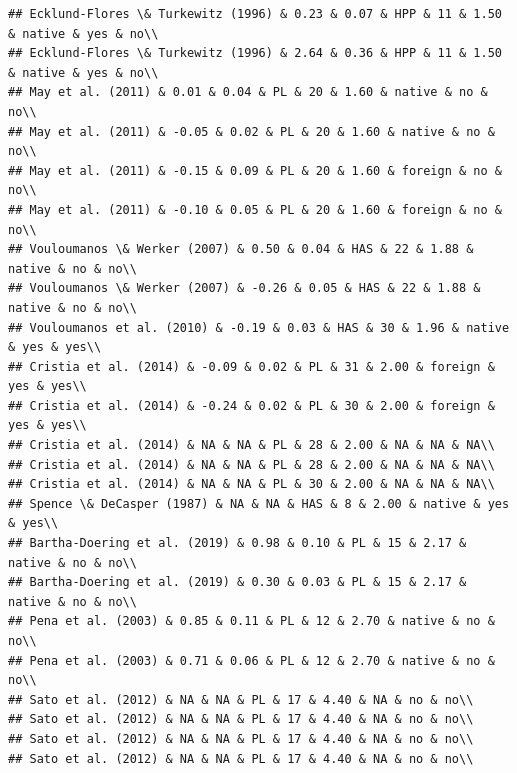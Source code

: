 \documentclass[man]{apa6}
\begin{document}
\begin{verbatim}
## Ecklund-Flores \& Turkewitz (1996) & 0.23 & 0.07 & HPP & 11 & 1.50 & native & yes & no\\
## Ecklund-Flores \& Turkewitz (1996) & 2.64 & 0.36 & HPP & 11 & 1.50 & native & yes & no\\
## May et al. (2011) & 0.01 & 0.04 & PL & 20 & 1.60 & native & no & no\\
## May et al. (2011) & -0.05 & 0.02 & PL & 20 & 1.60 & native & no & no\\
## May et al. (2011) & -0.15 & 0.09 & PL & 20 & 1.60 & foreign & no & no\\
## May et al. (2011) & -0.10 & 0.05 & PL & 20 & 1.60 & foreign & no & no\\
## Vouloumanos \& Werker (2007) & 0.50 & 0.04 & HAS & 22 & 1.88 & native & no & no\\
## Vouloumanos \& Werker (2007) & -0.26 & 0.05 & HAS & 22 & 1.88 & native & no & no\\
## Vouloumanos et al. (2010) & -0.19 & 0.03 & HAS & 30 & 1.96 & native & yes & yes\\
## Cristia et al. (2014) & -0.09 & 0.02 & PL & 31 & 2.00 & foreign & yes & yes\\
## Cristia et al. (2014) & -0.24 & 0.02 & PL & 30 & 2.00 & foreign & yes & yes\\
## Cristia et al. (2014) & NA & NA & PL & 28 & 2.00 & NA & NA & NA\\
## Cristia et al. (2014) & NA & NA & PL & 28 & 2.00 & NA & NA & NA\\
## Cristia et al. (2014) & NA & NA & PL & 30 & 2.00 & NA & NA & NA\\
## Spence \& DeCasper (1987) & NA & NA & HAS & 8 & 2.00 & native & yes & yes\\
## Bartha-Doering et al. (2019) & 0.98 & 0.10 & PL & 15 & 2.17 & native & no & no\\
## Bartha-Doering et al. (2019) & 0.30 & 0.03 & PL & 15 & 2.17 & native & no & no\\
## Pena et al. (2003) & 0.85 & 0.11 & PL & 12 & 2.70 & native & no & no\\
## Pena et al. (2003) & 0.71 & 0.06 & PL & 12 & 2.70 & native & no & no\\
## Sato et al. (2012) & NA & NA & PL & 17 & 4.40 & NA & no & no\\
## Sato et al. (2012) & NA & NA & PL & 17 & 4.40 & NA & no & no\\
## Sato et al. (2012) & NA & NA & PL & 17 & 4.40 & NA & no & no\\
## Sato et al. (2012) & NA & NA & PL & 17 & 4.40 & NA & no & no\\

\end{verbatim}
\end{document}
